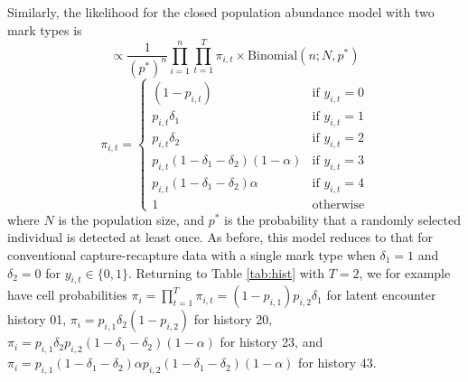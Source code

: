 \documentclass[12pt]{article}
\begin{document}
Similarly, the likelihood for the closed population abundance model with two mark types is
\begin{equation}
  [ {\bf Y} \mid {\bf p}, {\boldsymbol \delta}, \alpha, N ] \propto \frac{1}{\left( p^* \right)^n}\prod_{i=1}^{n} \prod_{t=1}^T \pi_{i,t} \times \text{Binomial} \left(n; N, p^* \right)
  \label{eq:closedlike}
\end{equation}
\begin{equation*}
  \pi_{i,t} = \begin{cases}
                \left( 1-p_{i,t} \right) & \text{if } y_{i,t}=0\\
                p_{i,t} \delta_1  & \text{if } y_{i,t}=1\\
                p_{i,t} \delta_2  & \text{if } y_{i,t}=2\\
                p_{i,t} \left( 1 - \delta_1 - \delta_2 \right) \left( 1 - \alpha \right) & \text{if } y_{i,t}=3\\
                p_{i,t} \left( 1 - \delta_1 - \delta_2 \right) \alpha & \text{if } y_{i,t}=4\\
                1 & \text{otherwise}
              \end{cases}
\end{equation*}
where $N$ is the population size, and $p^*$ is the probability that a randomly selected individual is detected at least once. As before, this model reduces to that for conventional capture-recapture data with a single mark type when $\delta_1=1$ and $\delta_2=0$ for $y_{i,t} \in \{0,1\}$. Returning to Table \ref{tab:hist} with $T=2$, we for example have cell probabilities $\pi_i=\prod_{t=1}^T \pi_{i,t}=\left(1-p_{i,1}\right) p_{i,2} \delta_1$ for latent encounter history 01, $\pi_i= p_{i,1} \delta_2 \left(1-p_{i,2}\right)$ for history 20, $\pi_i=p_{i,1} \delta_2 p_{i,2} \left(1-\delta_1-\delta_2\right) \left(1-\alpha\right)$ for history 23, and $\pi_i=p_{i,1} \left(1-\delta_1-\delta_2\right) \alpha p_{i,2} \left(1-\delta_1-\delta_2\right) \left(1-\alpha\right)$ for history 43.
\end{document}
